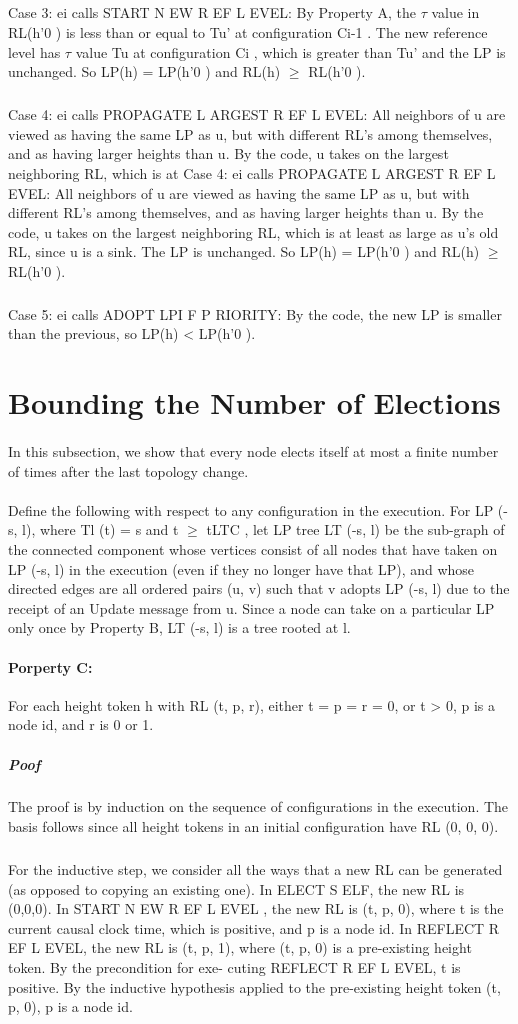 \subparagraph{}Case 3: ei calls START N EW R EF L EVEL: By Property A, the $\tau$ value in RL(h'0 ) is less than or equal to Tu' at configuration Ci-1 . The new reference level has $\tau$ value Tu at configuration Ci , which is greater than Tu' and the LP is unchanged. So LP(h) = LP(h'0 ) and RL(h) $\geq$ RL(h'0 ).
\subparagraph{}Case 4: ei calls PROPAGATE L ARGEST R EF L EVEL: All neighbors of u are viewed as having the same LP as u, but with different RL's among themselves, and as having larger heights than u. By the code, u takes on the largest neighboring RL, which is at Case 4: ei calls PROPAGATE L ARGEST R EF L EVEL: All neighbors of u are viewed as having the same LP as u, but with different RL’s among themselves, and as having larger heights than u. By the code, u takes on the largest neighboring RL, which is at least as large as u’s old RL, since u is a sink. The LP is unchanged. So LP(h) = LP(h'0 ) and RL(h) $\geq$ RL(h'0 ).
\subparagraph{}Case 5: ei calls ADOPT LPI F P RIORITY: By the code, the new LP is smaller than the previous, so LP(h) < LP(h'0 ).
\section{Bounding the Number of Elections}
\paragraph{}In this subsection, we show that every node elects itself at most a finite number of times after the last topology change.
\paragraph{}Define the following with respect to any configuration in the execution. For LP (-s, l), where Tl (t) = s and t $\geq$ tLTC , let LP tree LT (-s, l) be the sub-graph of the connected component whose vertices consist of all nodes that have taken on LP (-s, l) in the execution (even if they no longer have that LP), and whose directed edges are all ordered pairs (u, v) such that v adopts LP (-s, l) due to the receipt of an Update message from u. Since a node can take on a particular LP only once by Property B, LT (-s, l) is a tree rooted at l.
\paragraph{Porperty C:}For each height token h with RL (t, p, r), either t = p = r = 0, or t > 0, p is a node id, and r is 0 or 1.
\subparagraph{Poof}The proof is by induction on the sequence of configurations in the execution. The basis follows since all height tokens in an initial configuration have RL (0, 0, 0).
\subparagraph{}For the inductive step, we consider all the ways that a new RL can be generated (as opposed to copying an existing one). In ELECT S ELF, the new RL is (0,0,0). In START N EW R EF L EVEL , the new RL is (t, p, 0), where t is the current causal clock time, which is positive, and p is a node id. In REFLECT R EF L EVEL, the new RL is (t, p, 1), where (t, p, 0) is a pre-existing height token. By the precondition for exe- cuting REFLECT R EF L EVEL, t is positive. By the inductive hypothesis applied to the pre-existing height token (t, p, 0), p is a node id.
